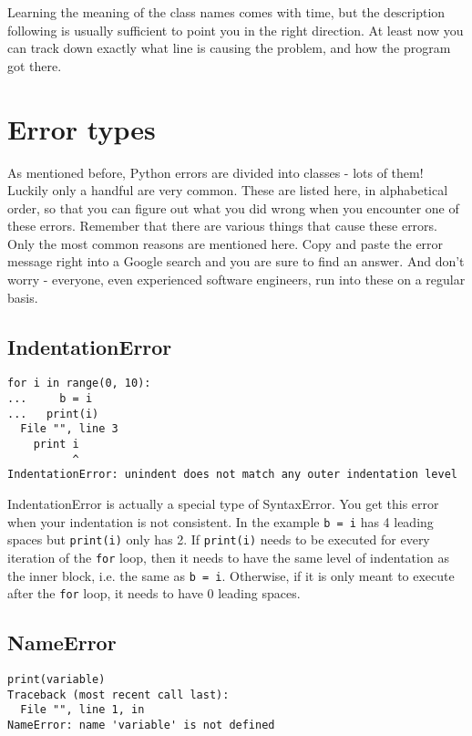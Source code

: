 Learning the meaning of the class names comes with time, but the   description following is usually sufficient to point you in the right   direction. At least now you can track down exactly what line is causing   the problem, and how the program got there.

\section{Error types}

As mentioned before, Python errors are divided into classes - lots of them!                 Luckily only a handful are very common. These are listed here, in alphabetical order,                 so that you can figure out what you did wrong when you encounter one of these errors. Remember that                 there are various things that cause these errors. Only the most common reasons are mentioned here. Copy and paste the error message                 right into a Google search and you are sure to find an answer. And don't worry -                  everyone, even experienced software engineers, run into these on a regular basis.

\subsection{IndentationError}


\begin{lstlisting}
for i in range(0, 10):
...     b = i
...   print(i)
  File "", line 3
    print i
          ^
IndentationError: unindent does not match any outer indentation level\end{lstlisting}

IndentationError is actually a special type of SyntaxError. You get this error when your indentation is not consistent. In the                  example 
\texttt{b = i} has 4 leading spaces but 
\texttt{print(i)} only has 2. If 
\texttt{print(i)} needs to be executed                 for every iteration of the \texttt{for} loop, then it needs to have the same level of indentation as the inner block, i.e. the same as 
\texttt{b = i}.                 Otherwise, if it is only meant to execute after the \texttt{for} loop, it needs to have 0 leading spaces.

\subsection{NameError}

\begin{lstlisting}
print(variable)
Traceback (most recent call last):
  File "", line 1, in 
NameError: name 'variable' is not defined\end{lstlisting}

